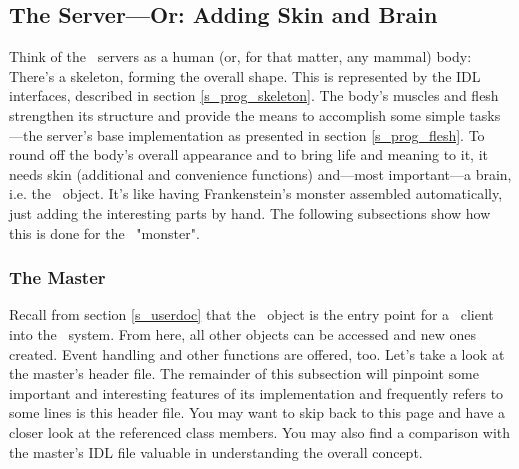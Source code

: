 \subsection[The Server]{\label{s_prog_server}The Server---Or: Adding Skin 
                                             and Brain}
Think of the \qidl\ servers as a human (or, for that matter, any mammal)
body: There's a skeleton, forming the overall shape. This is
represented by the IDL interfaces, described in section
\ref{s_prog_skeleton}. The body's muscles and flesh strengthen its structure
and provide the means to accomplish some simple tasks---the server's base
implementation as presented in section \ref{s_prog_flesh}. To round off the
body's overall appearance and to bring life and meaning to it, it needs skin
(additional and convenience functions) and---most important---a brain, i.e.
the \master\ object. It's like having Frankenstein's monster assembled
automatically, just adding the interesting parts by hand. The following
subsections show how this is done for the \qidl\ "monster".

\subsubsection{The Master}
Recall from section \ref{s_userdoc} that the \master\ object is the entry point
for a \qidl\ client into the \codine\ system. From here, all other objects
can be accessed and new ones created. Event handling and other functions are
offered, too. Let's take a look at the master's header file. The remainder of
this subsection will pinpoint some important and interesting features of its
implementation and frequently refers to some lines is this header file. You
may want to skip back to this page and have a closer look at the referenced
class members. You may also find a comparison with the master's IDL file 
valuable in understanding the overall concept.

